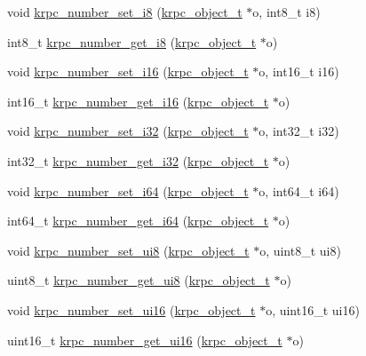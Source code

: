 \begin{DoxyCompactItemize}
void \hyperlink{group__rpc_gac97afef390289879f19cda9149beb684}{krpc\+\_\+number\+\_\+set\+\_\+i8} (\hyperlink{struct__krpc__object__t}{krpc\+\_\+object\+\_\+t} $\ast$o, int8\+\_\+t i8)
\item 
int8\+\_\+t \hyperlink{group__rpc_ga5f14e2a44d3dd64fc1bc54e28b431587}{krpc\+\_\+number\+\_\+get\+\_\+i8} (\hyperlink{struct__krpc__object__t}{krpc\+\_\+object\+\_\+t} $\ast$o)
\item 
void \hyperlink{group__rpc_ga1b6cbaa51e2171bec6e5b2f97fe6223c}{krpc\+\_\+number\+\_\+set\+\_\+i16} (\hyperlink{struct__krpc__object__t}{krpc\+\_\+object\+\_\+t} $\ast$o, int16\+\_\+t i16)
\item 
int16\+\_\+t \hyperlink{group__rpc_ga090dd58301d21979a05fe6fc249e3a80}{krpc\+\_\+number\+\_\+get\+\_\+i16} (\hyperlink{struct__krpc__object__t}{krpc\+\_\+object\+\_\+t} $\ast$o)
\item 
void \hyperlink{group__rpc_gaf70d32f6fb59d76e67e596d0feeee14b}{krpc\+\_\+number\+\_\+set\+\_\+i32} (\hyperlink{struct__krpc__object__t}{krpc\+\_\+object\+\_\+t} $\ast$o, int32\+\_\+t i32)
\item 
int32\+\_\+t \hyperlink{group__rpc_gad287178bafa8b9495016ee747db8e090}{krpc\+\_\+number\+\_\+get\+\_\+i32} (\hyperlink{struct__krpc__object__t}{krpc\+\_\+object\+\_\+t} $\ast$o)
\item 
void \hyperlink{group__rpc_gabf92e2dab46131d75789812059214724}{krpc\+\_\+number\+\_\+set\+\_\+i64} (\hyperlink{struct__krpc__object__t}{krpc\+\_\+object\+\_\+t} $\ast$o, int64\+\_\+t i64)
\item 
int64\+\_\+t \hyperlink{group__rpc_ga41bb57b2a053c9aeb22c98e0cbfbc2e4}{krpc\+\_\+number\+\_\+get\+\_\+i64} (\hyperlink{struct__krpc__object__t}{krpc\+\_\+object\+\_\+t} $\ast$o)
\item 
void \hyperlink{group__rpc_ga0abbc84b15e73781209485cbfa4d2a56}{krpc\+\_\+number\+\_\+set\+\_\+ui8} (\hyperlink{struct__krpc__object__t}{krpc\+\_\+object\+\_\+t} $\ast$o, uint8\+\_\+t ui8)
\item 
uint8\+\_\+t \hyperlink{group__rpc_ga921ba1649bda27068e3d048b854ed708}{krpc\+\_\+number\+\_\+get\+\_\+ui8} (\hyperlink{struct__krpc__object__t}{krpc\+\_\+object\+\_\+t} $\ast$o)
\item 
void \hyperlink{group__rpc_ga7990cb68203c5ab0d1534ef616fd1aad}{krpc\+\_\+number\+\_\+set\+\_\+ui16} (\hyperlink{struct__krpc__object__t}{krpc\+\_\+object\+\_\+t} $\ast$o, uint16\+\_\+t ui16)
\item 
uint16\+\_\+t \hyperlink{group__rpc_gaa2f3b1c450f36d181e585924ff7954a5}{krpc\+\_\+number\+\_\+get\+\_\+ui16} (\hyperlink{struct__krpc__object__t}{krpc\+\_\+object\+\_\+t} $\ast$o)

\end{DoxyCompactItemize}

